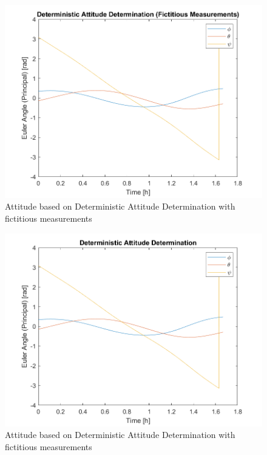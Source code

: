 \begin{figure}[H]
\centering
\includegraphics[scale=0.7]{Images/ps6_problem6_DADFict.png}
\caption{Attitude based on Deterministic Attitude Determination with fictitious measurements}
\label{fig:Images/ps6_problem6_DADFict}
\end{figure}

\begin{figure}[H]
\centering
\includegraphics[scale=0.7]{Images/ps6_problem6_DAD.png}
\caption{Attitude based on Deterministic Attitude Determination with fictitious measurements}
\label{fig:Images/ps6_problem6_DAD}
\end{figure}

